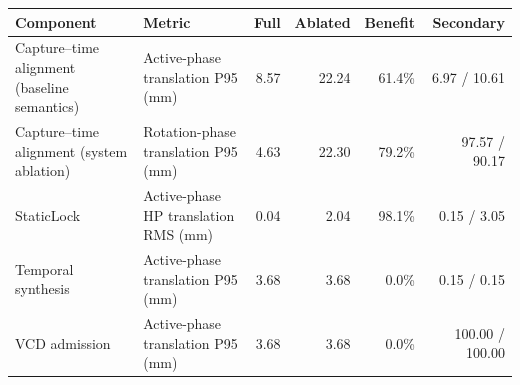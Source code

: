 \begin{tabular}{llrrrr}
\toprule
Component & Metric & Full & Ablated & Benefit & Secondary \\
\midrule
Capture--time alignment (baseline semantics) & Active-phase translation P95 (mm) & 8.57 & 22.24 & 61.4\% & 6.97 / 10.61 \\
Capture--time alignment (system ablation) & Rotation-phase translation P95 (mm) & 4.63 & 22.30 & 79.2\% & 97.57 / 90.17 \\
StaticLock & Active-phase HP translation RMS (mm) & 0.04 & 2.04 & 98.1\% & 0.15 / 3.05 \\
Temporal synthesis & Active-phase translation P95 (mm) & 3.68 & 3.68 & 0.0\% & 0.15 / 0.15 \\
VCD admission & Active-phase translation P95 (mm) & 3.68 & 3.68 & 0.0\% & 100.00 / 100.00 \\
\bottomrule
\end{tabular}
